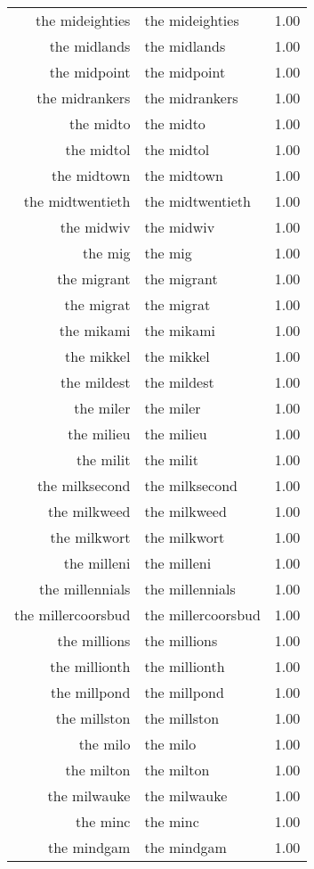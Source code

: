 \begin{table}[ht]
\begin{tabular}{rlr}
  the mideighties & the mideighties & 1.00 \\ 
  the midlands & the midlands & 1.00 \\ 
  the midpoint & the midpoint & 1.00 \\ 
  the midrankers & the midrankers & 1.00 \\ 
  the midto & the midto & 1.00 \\ 
  the midtol & the midtol & 1.00 \\ 
  the midtown & the midtown & 1.00 \\ 
  the midtwentieth & the midtwentieth & 1.00 \\ 
  the midwiv & the midwiv & 1.00 \\ 
  the mig & the mig & 1.00 \\ 
  the migrant & the migrant & 1.00 \\ 
  the migrat & the migrat & 1.00 \\ 
  the mikami & the mikami & 1.00 \\ 
  the mikkel & the mikkel & 1.00 \\ 
  the mildest & the mildest & 1.00 \\ 
  the miler & the miler & 1.00 \\ 
  the milieu & the milieu & 1.00 \\ 
  the milit & the milit & 1.00 \\ 
  the milksecond & the milksecond & 1.00 \\ 
  the milkweed & the milkweed & 1.00 \\ 
  the milkwort & the milkwort & 1.00 \\ 
  the milleni & the milleni & 1.00 \\ 
  the millennials & the millennials & 1.00 \\ 
  the millercoorsbud & the millercoorsbud & 1.00 \\ 
  the millions & the millions & 1.00 \\ 
  the millionth & the millionth & 1.00 \\ 
  the millpond & the millpond & 1.00 \\ 
  the millston & the millston & 1.00 \\ 
  the milo & the milo & 1.00 \\ 
  the milton & the milton & 1.00 \\ 
  the milwauke & the milwauke & 1.00 \\ 
  the minc & the minc & 1.00 \\ 
  the mindgam & the mindgam & 1.00 \\ 

\end{tabular}
\end{table}
